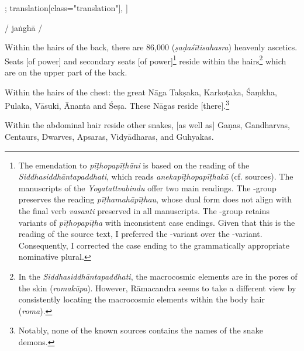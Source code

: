 \begin{alignment}[
  texts=edition[class="edition"];
  translation[class="translation"],
  ]
\begin{edition}
\begin{prose}[p41_02]
{  
}
/
jaṅghā
/
    \end{prose}
  \end{edition}
  \begin{translation}
    \begin{tlate}[p41_02]
      \noindent
Within the hairs of the back, there are 86,000 (\textit{ṣaḍaśītisahasra}) heavenly ascetics. Seats [of power] and secondary seats [of power]\footnote{The emendation to \textit{pīṭhopapīṭhāni} is based on the reading of the \emph{Siddhasiddhāntapaddhati}, which reads \textit{anekapīṭhopapīṭhakā} (cf. sources). The manuscripts of the \emph{Yogatattvabindu} offer two main readings. The \alpha-group preserves the reading \textit{pīṭhamahāpīṭhau}, whose dual form does not align with the final verb \textit{vasanti} preserved in all manuscripts. The \beta-group retains variants of \textit{pīṭhopapīṭha} with inconsistent case endings. Given that this is the reading of the source text, I preferred the \beta-variant over the \alpha-variant. Consequently, I corrected the case ending to the grammatically appropriate nominative plural.} reside within the hairs\footnote{In the \emph{Siddhasiddhāntapaddhati}, the macrocosmic elements are in the pores of the skin (\textit{romakūpa}). However, Rāmacandra seems to take a different view by consistently locating the macrocosmic elements within the body hair (\textit{roma}).} which are on the upper part of the back.

Within the hairs of the chest: the great Nāga Takṣaka, Karkoṭaka, Śaṃkha, Pulaka, Vāsuki, Ānanta and Śeṣa. These Nāgas reside [there].\footnote{Notably, none of the known sources contains the names of the snake demons.}

Within the abdominal hair reside other snakes, [as well as] Gaṇas, Gandharvas, Centaurs, Dwarves, Apsaras, Vidyādharas, and Guhyakas.


\end{tlate}
\end{translation}
\end{alignment}
